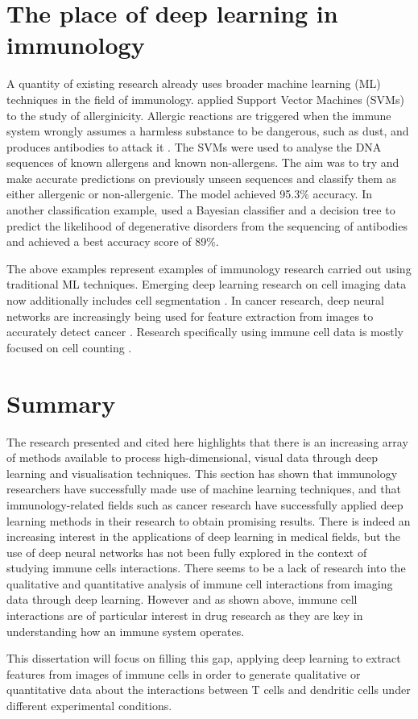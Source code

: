 \section{The place of deep learning in immunology} \label{sec:dl_immunology}

A quantity of existing research already uses broader machine learning (ML) techniques in the field of immunology. \citet{muh_allerhunter_2009} applied Support Vector Machines (SVMs) to the study of allerginicity. Allergic reactions are triggered when the immune system wrongly assumes a harmless substance to be dangerous, such as dust, and produces antibodies to attack it \citep{tregoning2020}. The SVMs were used to analyse the DNA sequences of known allergens and known non-allergens. The aim was to try and make accurate predictions on previously unseen sequences and classify them as either allergenic or non-allergenic. The model achieved 95.3\% accuracy.  In another classification example, \citet{david_using_2010} used a Bayesian classifier and a decision tree to predict the likelihood of degenerative disorders from the sequencing of antibodies and achieved a best accuracy score of 89\%. 

The above examples represent examples of immunology research carried out using traditional ML techniques. Emerging deep learning research on cell imaging data now additionally includes cell segmentation \citep{al-kofahi_deep_2018}. In cancer research, deep neural networks are increasingly being used for feature extraction from images to accurately detect cancer \citep{litjens_deep_2016, bychkov_deep_2018}. Research specifically using immune cell data is mostly focused on cell counting \citep{turkki_antibody-supervised_2016, aprupe_robust_2019}. 

\section{Summary}

The research presented and cited here highlights that there is an increasing array of methods available to process high-dimensional, visual data through deep learning and visualisation techniques. This section has shown that immunology researchers have successfully made use of machine learning techniques, and that immunology-related fields such as cancer research have successfully applied deep learning methods in their research to obtain promising results. There is indeed an increasing interest in the applications of deep learning in medical fields, but the use of deep neural networks has not been fully explored in the context of studying immune cells interactions. There seems to be a lack of research into the qualitative and quantitative analysis of immune cell interactions from imaging data through deep learning. However and as shown above, immune cell interactions are of particular interest in drug research as they are key in understanding how an immune system operates.

This dissertation will focus on filling this gap, applying deep learning to extract features from images of immune cells in order to generate qualitative or quantitative data about the interactions between T cells and dendritic cells under different experimental conditions.